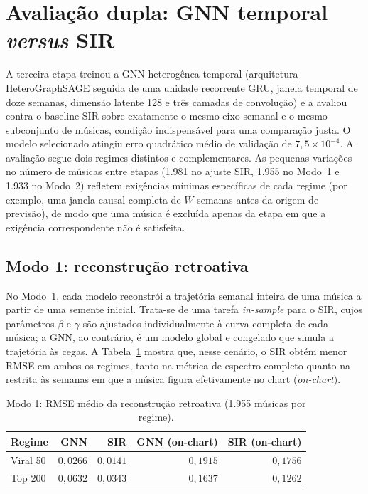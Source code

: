 
\section{Avaliação dupla: GNN temporal \emph{versus} SIR}
\label{sec:avaliacao-dupla}

A terceira etapa treinou a GNN heterogênea temporal (arquitetura HeteroGraphSAGE seguida de uma unidade recorrente GRU, janela temporal de doze semanas, dimensão latente 128 e três camadas de convolução) e a avaliou contra o baseline SIR sobre exatamente o mesmo eixo semanal e o mesmo subconjunto de músicas, condição indispensável para uma comparação justa. O modelo selecionado atingiu erro quadrático médio de validação de $7{,}5 \times 10^{-4}$. A avaliação segue dois regimes distintos e complementares. As pequenas variações no número de músicas entre etapas (1.981 no ajuste SIR, 1.955 no Modo~1 e 1.933 no Modo~2) refletem exigências mínimas específicas de cada regime (por exemplo, uma janela causal completa de $W$ semanas antes da origem de previsão), de modo que uma música é excluída apenas da etapa em que a exigência correspondente não é satisfeita.

\subsection{Modo 1: reconstrução retroativa}

No Modo~1, cada modelo reconstrói a trajetória semanal inteira de uma música a partir de uma semente inicial. Trata-se de uma tarefa \emph{in-sample} para o SIR, cujos parâmetros $\beta$ e $\gamma$ são ajustados individualmente à curva completa de cada música; a GNN, ao contrário, é um modelo global e congelado que simula a trajetória às cegas. A Tabela~\ref{tab:phase3-mode1} mostra que, nesse cenário, o SIR obtém menor RMSE em ambos os regimes, tanto na métrica de espectro completo quanto na restrita às semanas em que a música figura efetivamente no chart (\emph{on-chart}).

\begin{table}[htbp]
\centering
\caption{Modo 1: RMSE médio da reconstrução retroativa (1.955 músicas por regime).}
\label{tab:phase3-mode1}
\begin{tabular}{lrrrr}
\hline
\textbf{Regime} & \textbf{GNN} & \textbf{SIR} & \textbf{GNN (on-chart)} & \textbf{SIR (on-chart)} \\
\hline
Viral 50 & $0{,}0266$ & $0{,}0141$ & $0{,}1915$ & $0{,}1756$ \\
Top 200  & $0{,}0632$ & $0{,}0343$ & $0{,}1637$ & $0{,}1262$ \\
\hline
\end{tabular}
\end{table}

